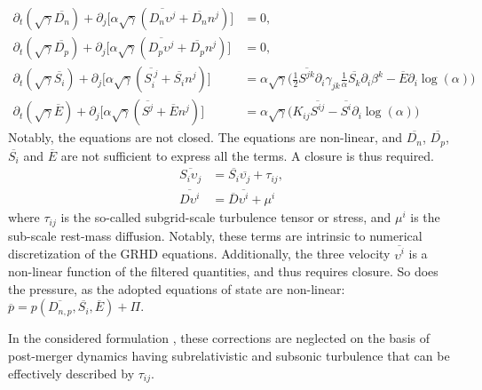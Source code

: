 \begin{equation}
\begin{aligned}
\label{eq:method:whisky:emomcons_lk_filt}
\partial_t(\sqrt{\gamma}\overline{D_n}) + \partial_j\Big[ \alpha\sqrt{\gamma}(\overline{D_n\upsilon^j} + \overline{D_n}n^j) \Big] &= 0, \\
\partial_t(\sqrt{\gamma}\overline{D_p}) + \partial_j\Big[ \alpha\sqrt{\gamma}(\overline{D_p\upsilon^j} + \overline{D_p}n^j) \Big] &= 0, \\
\partial_t(\sqrt{\gamma}\overline{S_i}) + \partial_j\Big[ \alpha \sqrt{\gamma} (\overline{S_i^{\; j}} + \overline{S_i} n^j) \Big] &= 
\alpha \sqrt{\gamma}\Big( \frac{1}{2} \overline{S^{jk}} \partial_i \gamma_{jk} \frac{1}{\alpha} \overline{S_k} \partial_i \beta^k - \overline{E}\partial_i \log(\alpha) \Big) \\
\partial_t(\sqrt{\gamma}\overline{E}) + \partial_j\Big[ \alpha \sqrt{\gamma} (\overline{S^{j}} + \overline{E} n^j) \Big] &= 
\alpha \sqrt{\gamma}\Big( K_{ij}\overline{S^{ij}} - \overline{S^i}\partial_i \log(\alpha) \Big) 
\end{aligned}
\end{equation}
%
Notably, the equations are not closed. 
The equations are non-linear, and 
$\overline{D_{n}}$, $\overline{D_p}$, $\overline{S_i}$ and $\overline{E}$ 
are not sufficient to express all the terms.
A closure is thus required.
%
\begin{equation}
\begin{aligned}
\overline{S_i\upsilon_j} &= \overline{S_i}\overline{\upsilon_j} + \tau_{ij}, \\
\overline{D\upsilon^i} &= \overline{D}\overline{\upsilon^i} + \mu^i
\end{aligned}
\end{equation}
%
where $\tau_{ij}$ is the so-called subgrid-scale turbulence tensor \citep{Radice:2017zta} 
or stress, and $\mu^i$ is the sub-scale rest-mass diffusion.
%
Notably, these terms are intrinsic to numerical discretization of the \ac{GRHD} equations. 
%
Additionally, the three velocity $\overline{\upsilon^i}$ is a non-linear function of the filtered quantities, and thus requires closure. 
So does the pressure, as the adopted equations of state are non-linear:
%
$\overline{p} = p(\overline{D_{n,p}},\overline{S_i},\overline{E}) + \Pi$.


In the considered formulation \cite{Radice:2020ids}, these corrections are neglected on the basis of
post-merger dynamics having subrelativistic and subsonic turbulence that 
can be effectively described by $\tau_{ij}$.

